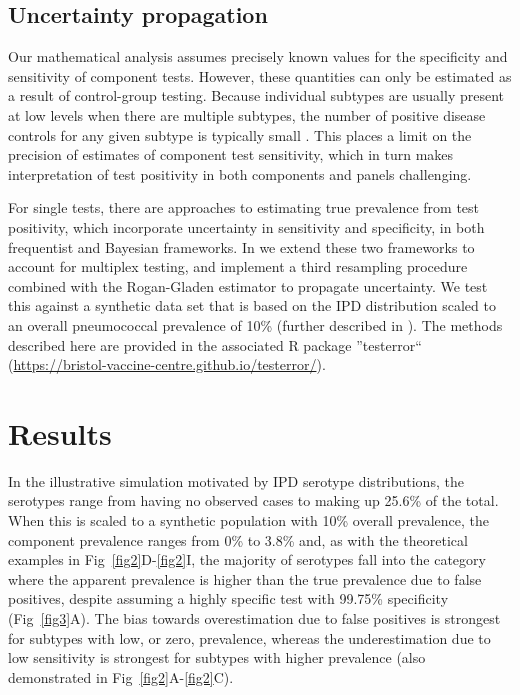 \documentclass[10pt,letterpaper]{article}
\begin{document}
\subsection*{Uncertainty propagation}

Our mathematical analysis assumes precisely known values for the specificity and sensitivity of component tests. However, these quantities can only be estimated as a result of control-group testing. Because individual subtypes are usually present at low levels when there are multiple subtypes, the number of positive disease controls for any given subtype is typically small \cite{bonten2015}. This places a limit on the precision of estimates of component test sensitivity, which in turn makes interpretation of test positivity in both components and panels challenging.

For single tests, there are approaches to estimating true prevalence from test positivity, which incorporate uncertainty in sensitivity and specificity, in both frequentist\cite{lang2014,thomas2022,flor2020} and Bayesian frameworks\cite{gelman2020,flor2020,diggle2011}. In  we extend these two frameworks to account for multiplex testing, and implement a third resampling procedure combined with the Rogan-Gladen estimator to propagate uncertainty. We test this against a synthetic data set that is based on the IPD distribution scaled to an overall pneumococcal prevalence of 10\% (further described in ). The methods described here are provided in the associated R package ''testerror``  (\url{https://bristol-vaccine-centre.github.io/testerror/}).

\section*{Results}

In the illustrative simulation motivated by IPD serotype distributions, the serotypes range from having no observed cases to making up 25.6\% of the total\cite{hyams2023}. When this is scaled to a synthetic population with 10\% overall prevalence, the component prevalence ranges from 0\% to 3.8\% and, as with the theoretical examples in Fig~\ref{fig2}D-\ref{fig2}I, the majority of serotypes fall into the category where the apparent prevalence is higher than the true prevalence due to false positives, despite assuming a highly specific test with 99.75\% specificity (Fig~\ref{fig3}A). The bias towards overestimation due to false positives is strongest for subtypes with low, or zero, prevalence, whereas the underestimation due to low sensitivity is strongest for subtypes with higher prevalence (also demonstrated in Fig~\ref{fig2}A-\ref{fig2}C).
\end{document}
